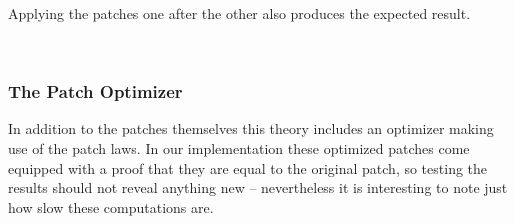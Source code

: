 Applying the patches one after the other also produces the expected result.
\begin{code}%
%
\>[2]\AgdaFunction{\AgdaUnderscore{}}\AgdaSpace{}%
\AgdaSymbol{:}\AgdaSpace{}%
\AgdaSpace{}%
\AgdaSpace{}%
\AgdaSymbol{(}\AgdaSpace{}%
\AgdaSpace{}%
\AgdaSymbol{)}\AgdaSpace{}%
\AgdaSpace{}%
\AgdaSpace{}%
\AgdaSpace{}%
\AgdaSpace{}%
\AgdaSpace{}%
\AgdaInductiveConstructor{[]}\<%
\\
%
\>[2]\AgdaSymbol{\AgdaUnderscore{}}\AgdaSpace{}%
\AgdaSymbol{=}\AgdaSpace{}%
\AgdaSpace{}%
\AgdaSymbol{(}\AgdaSpace{}%
\AgdaSymbol{)}\AgdaSpace{}%
\AgdaSymbol{(}\AgdaSpace{}%
\AgdaSymbol{(}\AgdaSpace{}%
\AgdaSpace{}%
\AgdaSpace{}%
\AgdaSpace{}%
\AgdaInductiveConstructor{[]}\AgdaSymbol{))}\AgdaSpace{}%
\AgdaSpace{}%
\AgdaSpace{}%
\AgdaSymbol{\AgdaUnderscore{}}\<%
\end{code}

\subsubsection{The Patch Optimizer}

In addition to the patches themselves this theory includes an optimizer
making use of the patch laws. In our implementation these optimized patches come equipped
with a proof that they are equal to the original patch, so testing the results should not reveal
anything new -- nevertheless it is interesting to note just how slow these computations are.

